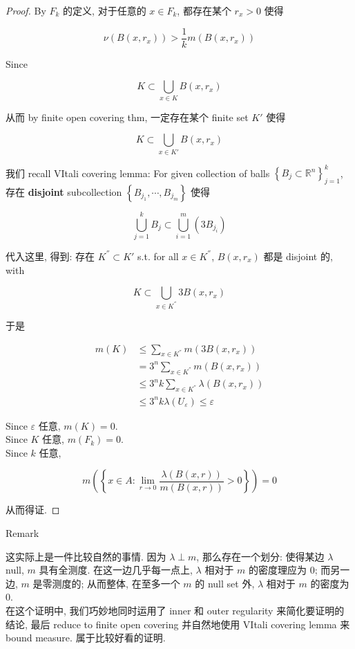 \begin{proof}
By \(F_{k}\) 的定义, 对于任意的 \(x \in F_{k}\), 都存在某个 \(r_{x} > 0\) 使得

\[\nu(B(x,r_{x})) > \frac{1}{k}m(B(x,r_{x}))\]

Since

\[K \subset \bigcup\limits_{x \in K}B(x,r_{x})\]

从而 by finite open covering thm, 一定存在某个 finite set \(K'\) 使得

\[K \subset \bigcup\limits_{x \in K'}B(x,r_{x})\]

我们 recall VItali covering lemma: For given collection of balls \(\left\{ {B_{j} \subset \mathbb{R}^{n}} \right\}_{j = 1}^{k}\), 存在 \textbf{disjoint} subcollection \(\left\{ {B_{j_{1}},\cdots,B_{j_{m}}} \right\}\) 使得

\[\bigcup\limits_{j = 1}^{k}B_{j} \subset \bigcup\limits_{i = 1}^{m}(3B_{j_{i}})\]

代入这里, 得到: 存在 \(K^{''} \subset K'\) s.t. for all \(x \in K^{''}\), \(B(x,r_{x})\) 都是 disjoint 的, with

\[K \subset \bigcup\limits_{x \in K^{''}}3B(x,r_{x})\]

于是

\[\begin{matrix}
{m(K)} & {\leq \sum\limits_{x \in K^{''}}m(3B(x,r_{x}))} \\
 & {= 3^{n}\sum\limits_{x \in K^{''}}m(B(x,r_{x}))} \\
 & {\leq 3^{n}k\sum\limits_{x \in K^{''}}\lambda(B(x,r_{x}))} \\
 & {\leq 3^{n}k\lambda(U_{\varepsilon}) \leq \varepsilon}
\end{matrix}\]

Since \(\varepsilon\) 任意, \(m(K) = 0\).\\
Since \(K\) 任意, \(m(F_{k}) = 0\).\\
Since \(k\) 任意,

\[m(\left\{ {x \in A:\lim\limits_{r\rightarrow 0}\frac{\lambda(B(x,r))}{m(B(x,r))} > 0} \right\}) = 0\]

从而得证.

\end{proof}

\begin{qlremark}{Remark}

这实际上是一件比较自然的事情. 因为 \(\lambda \perp m\), 那么存在一个划分: 使得某边 \(\lambda\) null, \(m\) 具有全测度. 在这一边几乎每一点上, \(\lambda\) 相对于 \(m\) 的密度理应为 \(0\); 而另一边, \(m\) 是零测度的; 从而整体, 在至多一个 \(m\) 的 null set 外, \(\lambda\) 相对于 \(m\) 的密度为 \(0\).\\
在这个证明中, 我们巧妙地同时运用了 inner 和 outer regularity 来简化要证明的结论, 最后 reduce to finite open covering 并自然地使用 VItali covering lemma 来 bound measure. 属于比较好看的证明.

\end{qlremark}

